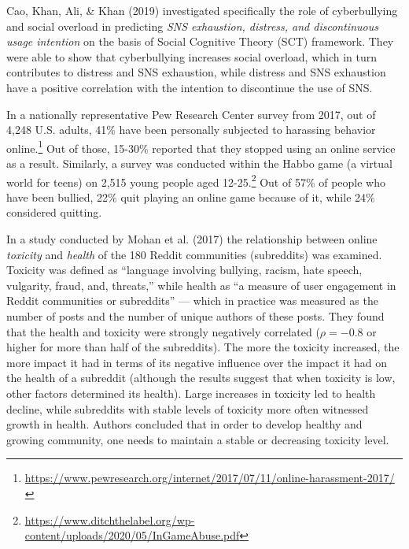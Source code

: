 \documentclass[10pt,dvipsnames]{scrartcl}
\begin{document}
Cao, Khan, Ali, \& Khan (2019) investigated specifically the role of
cyberbullying and social overload in predicting
\textit{SNS exhaustion, distress, and discontinuous usage intention} on
the basis of Social Cognitive Theory (SCT) framework. They were able to
show that cyberbullying increases social overload, which in turn
contributes to distress and SNS exhaustion, while distress and SNS
exhaustion have a positive correlation with the intention to discontinue
the use of SNS.

In a nationally representative Pew Research Center survey from 2017, out
of 4,248 U.S. adults, 41\% have been personally subjected to harassing
behavior
online.\footnote{\url{https://www.pewresearch.org/internet/2017/07/11/online-harassment-2017/}}
Out of those, 15-30\% reported that they stopped using an online service
as a result. Similarly, a survey was conducted within the Habbo game (a
virtual world for teens) on 2,515 young people aged
12-25.\footnote{\url{https://www.ditchthelabel.org/wp-content/uploads/2020/05/InGameAbuse.pdf}}
Out of 57\% of people who have been bullied, 22\% quit playing an online
game because of it, while 24\% considered quitting.

In a study conducted by Mohan et al. (2017) the relationship between
online \emph{toxicity} and \emph{health} of the 180 Reddit communities
(subreddits) was examined. Toxicity was defined as ``language involving
bullying, racism, hate speech, vulgarity, fraud, and, threats,'' while
health as ``a measure of user engagement in Reddit communities or
subreddits'' --- which in practice was measured as the number of posts
and the number of unique authors of these posts. They found that the
health and toxicity were strongly negatively correlated (\(\rho=-0.8\)
or higher for more than half of the subreddits). The more the toxicity
increased, the more impact it had in terms of its negative influence
over the impact it had on the health of a subreddit (although the
results suggest that when toxicity is low, other factors determined its
health). Large increases in toxicity led to health decline, while
subreddits with stable levels of toxicity more often witnessed growth in
health. Authors concluded that in order to develop healthy and growing
community, one needs to maintain a stable or decreasing toxicity level.
\end{document}
